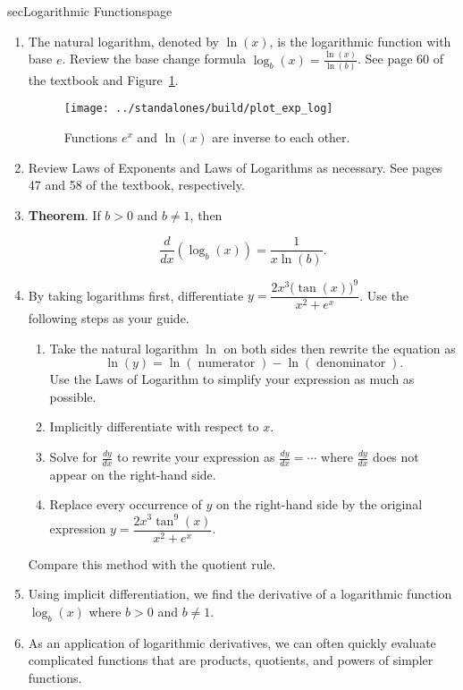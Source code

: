 \documentclass[../main]{subfiles}
\begin{document}
\begin{outline}{sec}{Logarithmic Functions}{page}
\begin{enumerate}
    \item The natural logarithm, denoted by \(\ln(x)\), is the logarithmic function with base \(e\). Review the base change formula \(\log_{b}(x) = \frac{\ln(x)}{\ln(b)}\). See page 60 of the textbook and Figure~\ref{fig:exp_log}.
      \begin{figure}[h]
        \centering
        \texttt{[image: ../standalones/build/plot\_exp\_log]}
        \caption{Functions \(e^{x}\) and \(\ln(x)\) are inverse to each other.}
        \label{fig:exp_log}
      \end{figure}

    \item Review Laws of Exponents and Laws of Logarithms as necessary. See pages 47 and 58 of the textbook, respectively.        
    \item \textbf{Theorem}. If \(b > 0\) and \(b \ne 1\), then
      \begin{mdframed}[style=simple]
        \[
          \frac{d}{dx} (\log_{b}(x)) = \frac{1}{x \ln(b)}.
        \]
      \end{mdframed}
        
    \item \label{part:ln-trick} By taking logarithms first, differentiate \(y = \dfrac{2x^{3}\big(\tan(x)\big)^{9}}{x^{2} + e^{x}}\). Use the following steps as your guide.
      \begin{enumerate}
        \item Take the natural logarithm \(\ln\) on both sides then rewrite the equation as
          \[
            \ln(y) = \ln(\;\text{numerator}\;) - \ln(\;\text{denominator}\;).
          \]
          Use the Laws of Logarithm to simplify your expression as much as possible.
        \item Implicitly differentiate with respect to \(x\).
        \item Solve for \(\frac{dy}{dx}\) to rewrite your expression as \(\frac{dy}{dx} = \cdots{}\) where \(\frac{dy}{dx}\) does not appear on the right-hand side.
        \item Replace every occurrence of \(y\) on the right-hand side by the original expression \(y = \dfrac{2x^{3}\tan^{9}(x)}{x^{2} + e^{x}}\).
      \end{enumerate}
      Compare this method with the quotient rule. 

    \item {Using implicit differentiation, we find the derivative of a logarithmic function \(\log_{b}(x)\) where \(b > 0\) and \(b \ne 1\).}
    \item {As an application of logarithmic derivatives, we can often quickly evaluate complicated functions that are products, quotients, and powers of simpler functions.}
\end{enumerate}
\end{outline}
\end{document}
